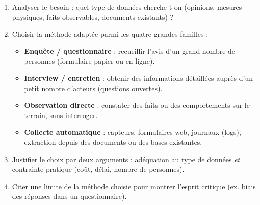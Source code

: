 \documentclass[11pt]{article}
\newcommand{\cle}[1]{{\popxbold\color{popdark}#1}}
\begin{document}
\begin{methode}
\begin{enumerate}
  \item \cle{Analyser le besoin} : quel type de données cherche-t-on (opinions, mesures physiques, faits observables, documents existants) ?
  \item \cle{Choisir la méthode adaptée} parmi les quatre grandes familles :
  \begin{itemize}
    \item \textbf{Enquête / questionnaire} : recueillir l'avis d'un grand nombre de personnes (formulaire papier ou en ligne).
    \item \textbf{Interview / entretien} : obtenir des informations détaillées auprès d'un petit nombre d'acteurs (questions ouvertes).
    \item \textbf{Observation directe} : constater des faits ou des comportements sur le terrain, sans interroger.
    \item \textbf{Collecte automatique} : capteurs, formulaires web, journaux (logs), extraction depuis des documents ou des bases existantes.
  \end{itemize}
  \item \cle{Justifier le choix} par deux arguments : adéquation au type de données \emph{et} contrainte pratique (coût, délai, nombre de personnes).
  \item \cle{Citer une limite} de la méthode choisie pour montrer l'esprit critique (ex. biais des réponses dans un questionnaire).
\end{enumerate}
\end{methode}
\end{document}
